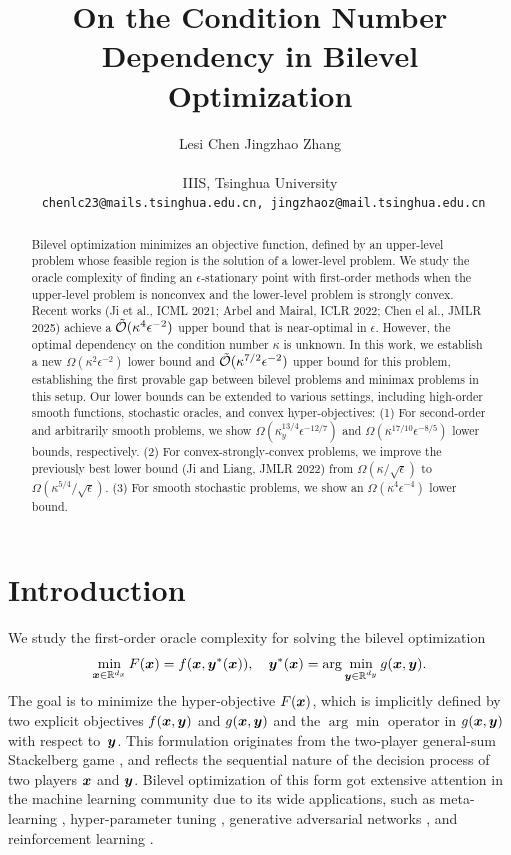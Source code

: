 \documentclass{article}
\title{On the Condition Number Dependency in
Bilevel Optimization}
\author{Lesi Chen \qquad 
\qquad Jingzhao Zhang  \\
\vspace{-2mm} \\
\normalsize{IIIS, Tsinghua University
} \\
\normalsize{ \texttt{ chenlc23@mails.tsinghua.edu.cn,  jingzhaoz@mail.tsinghua.edu.cn}} 
}
\begin{document}
\maketitle
\begingroup
\begin{NoHyper}
\end{NoHyper}
\endgroup
\begin{abstract}
Bilevel optimization minimizes an objective function, defined by an upper-level problem whose feasible region is the solution of a lower-level problem. We study the oracle complexity of finding an $\epsilon$-stationary point with first-order methods when the upper-level problem is nonconvex and the lower-level problem is strongly convex. 
Recent works (Ji et al., ICML 2021; Arbel and Mairal, ICLR 2022; Chen el al., JMLR 2025)  achieve a $\tilde {{\mathcal{O}}}(\kappa^4 \epsilon^{-2})$ upper bound that is near-optimal in $\epsilon$. However, the optimal dependency on the condition number $\kappa$ is unknown.
In this work, we establish a new $\Omega(\kappa^2 \epsilon^{-2})$ lower bound and $\tilde {{\mathcal{O}}}(\kappa^{7/2} \epsilon^{-2})$ upper bound for this problem, establishing the first provable gap between bilevel problems and minimax problems in this setup. 
Our lower bounds can be extended to various settings, including high-order smooth functions, stochastic oracles, and convex hyper-objectives: (1) For second-order and arbitrarily smooth problems, we show $\Omega(\kappa_y^{13/4} \epsilon^{-12/7})$ and $\Omega(\kappa^{17/10} \epsilon^{-8/5})$ lower bounds, respectively. 
(2) For convex-strongly-convex problems, we improve the previously best lower bound (Ji and Liang, JMLR 2022) from $\Omega(\kappa /\sqrt{\epsilon})$ to $\Omega(\kappa^{5/4} / \sqrt{\epsilon})$. 
(3) For smooth stochastic problems, we show an $\Omega(\kappa^4 \epsilon^{-4})$ lower bound.  
\end{abstract}

\section{Introduction}
We study the first-order oracle complexity for solving the bilevel optimization
\begin{align} \label{prob:main-BLO}
    \min_{{\bm{x}} \in {\mathbb{R}}^{d_x}} F({\bm{x}}) = f({\bm{x}},{\bm{y}}^*({\bm{x}})) , \quad {\bm{y}}^*({\bm{x}}) = \arg \min_{{\bm{y}} \in {\mathbb{R}}^{d_y}} g({\bm{x}},{\bm{y}}).
\end{align}
The goal is to minimize the hyper-objective $F({\bm{x}})$, which is implicitly defined by two explicit objectives $f({\bm{x}},{\bm{y}})$ and $g({\bm{x}},{\bm{y}})$ and the $\arg \min$ operator in $g({\bm{x}},{\bm{y}})$ with respect to~${\bm{y}}$. 
This formulation originates from the two-player general-sum Stackelberg game \citep{stackelberg1934marktform}, and reflects the sequential nature of the decision process of two players ${\bm{x}}$ and ${\bm{y}}$. Bilevel optimization of this form got extensive attention in the machine learning community due to its wide applications, such as meta-learning \citep{rajeswaran2019meta}, hyper-parameter tuning \citep{bao2021stability,franceschi2018bilevel,mackay2019self},  generative adversarial networks \citep{goodfellow2020generative}, and reinforcement learning \citep{konda1999actor,zeng2024two,hong2023two}.
\end{document}
